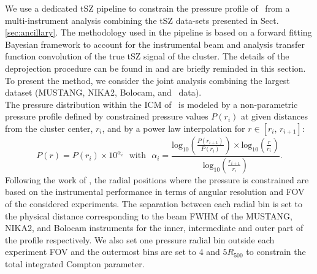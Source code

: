 \documentclass[traditabstract]{aa}
\begin{document}
We use a dedicated tSZ pipeline to constrain the pressure profile of \psz\ from a multi-instrument analysis combining the tSZ data-sets presented in Sect. \ref{sec:ancillary}. The methodology used in the pipeline is based on a forward fitting Bayesian framework to account for the instrumental beam and analysis transfer function convolution of the true tSZ signal of the cluster. The details of the deprojection procedure can be found in \cite{ada15,ada16a} and are briefly reminded in this section. To present the method, we consider the joint analysis combining the largest dataset (MUSTANG, NIKA2, Bolocam, and \planck\ data).\\
The pressure distribution within the ICM of \psz\ is modeled by a non-parametric pressure profile \citep[see][]{rup17} defined by constrained pressure values $P(r_i)$ at given distances from the cluster center, $r_i$, and by a power law interpolation for $r \in [r_i, \, r_{i+1}]$:
\begin{equation}
        P(r) = P(r_i)\times 10^{\alpha_i}~~~\mathrm{with}~~~ \alpha_i = \frac{\mathrm{log_{10}}\left(\frac{P(r_{i+1})}{P(r_i)}\right) \times \mathrm{log_{10}}\left(\frac{r}{r_i}\right)}{\mathrm{log_{10}}\left(\frac{r_{i+1}}{r_i}\right)}
\label{eq:P_profile}
.\end{equation} 
Following the work of \cite{rom17}, the radial positions where the pressure is constrained are based on the instrumental performance in terms of angular resolution and FOV of the considered experiments. The separation between each radial bin is set to the physical distance corresponding to the beam FWHM of the MUSTANG, NIKA2, and Bolocam instruments for the inner, intermediate and outer part of the profile respectively. We also set one pressure radial bin outside each experiment FOV and the outermost bins are set to 4 and $5R_{500}$ to constrain the total integrated Compton parameter.\\
\end{document}

